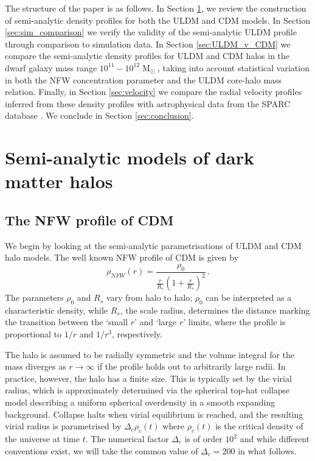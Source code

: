 \documentclass[a4paper,11pt]{article}
\begin{document}
The structure of the paper is as follows. In Section \ref{sec:models}, we review the construction of semi-analytic density profiles for both the ULDM and CDM models. In Section \ref{sec:sim_comparison} we  verify the validity of the semi-analytic ULDM profile  through comparison to simulation data. In Section \ref{sec:ULDM_v_CDM} we compare the semi-analytic density profiles for ULDM and CDM halos in the dwarf galaxy mass range $10^{11} - 10^{12}\operatorname{M}_{\odot}$, taking into account statistical variation in both the NFW concentration parameter and the ULDM core-halo mass relation. Finally, in Section \ref{sec:velocity} we compare the radial velocity profiles inferred from these density profiles with astrophysical data from the SPARC database \cite{Lelli:2016zqa}. We conclude in Section \ref{sec:conclusion}.






\section{Semi-analytic models of dark matter halos}\label{sec:models}


\subsection{The NFW profile of CDM}

We begin by looking at the semi-analytic parametrisations of ULDM and CDM halo models. The  well known  NFW   profile of CDM \cite{Navarro:1995iw, Maccio:2008pcd}  is given by
%
\begin{equation}\label{eq:nfw}
    \rho_{NFW}(r)=\frac{\rho_0}{\frac{r}{R_s}\left(1+\frac{r}{R_s}\right)^2} \, .
\end{equation}
%
The parameters $\rho_0$ and $R_s$ vary from halo to halo; $\rho_0$ can be interpreted as a characteristic density, while $R_s$, the scale radius, determines the distance marking the transition between the `small $r$' and `large $r$' limits, where the profile is proportional to $1/r$ and $1/r^3$, respectively.

The halo is assumed to be radially symmetric and the  volume integral for the mass  diverges as $r\rightarrow \infty$ if the  profile holds out to arbitrarily large radii. In practice, however, the halo has a finite size. This is typically set by the virial radius, which is approximately determined via the spherical top-hat collapse model \cite{White:2000jv, Suto:2015jdt, Herrera:2017epn} describing a uniform spherical overdensity in a smooth expanding background. Collapse halts when virial equilibrium is reached, and the resulting virial radius is parametrised by $\Delta_c \rho_c(t)$ where $\rho_c(t)$ is the critical density of the universe at time $t$. The numerical factor $\Delta_c$ is of order $10^2$ and while different conventions exist, we will take the common value of $\Delta_c = 200$ \cite{Richings:2018} in what follows. 
\end{document}
